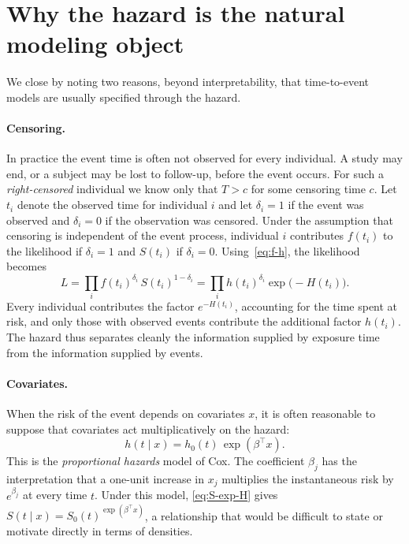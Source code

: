 \documentclass[11pt]{article}
\theoremstyle{definition}
\theoremstyle{plain}
\begin{document}
\section{Why the hazard is the natural modeling object}\label{sec:why}

We close by noting two reasons, beyond interpretability, that time-to-event models are usually specified through the hazard.

\paragraph{Censoring.} In practice the event time is often not observed for every individual. A study may end, or a subject may be lost to follow-up, before the event occurs. For such a \emph{right-censored} individual we know only that $T > c$ for some censoring time $c$. Let $t_i$ denote the observed time for individual $i$ and let $\delta_i = 1$ if the event was observed and $\delta_i = 0$ if the observation was censored. Under the assumption that censoring is independent of the event process, individual $i$ contributes $f(t_i)$ to the likelihood if $\delta_i = 1$ and $S(t_i)$ if $\delta_i = 0$. Using~\eqref{eq:f-h}, the likelihood becomes
\[
  L = \prod_i f(t_i)^{\delta_i}\, S(t_i)^{1 - \delta_i}
    = \prod_i h(t_i)^{\delta_i} \exp\bigl(-H(t_i)\bigr).
\]
Every individual contributes the factor $e^{-H(t_i)}$, accounting for the time spent at risk, and only those with observed events contribute the additional factor $h(t_i)$. The hazard thus separates cleanly the information supplied by exposure time from the information supplied by events.

\paragraph{Covariates.} When the risk of the event depends on covariates $x$, it is often reasonable to suppose that covariates act multiplicatively on the hazard:
\[
  h(t \mid x) = h_0(t)\,\exp(\beta^\top x).
\]
This is the \emph{proportional hazards} model of Cox. The coefficient $\beta_j$ has the interpretation that a one-unit increase in $x_j$ multiplies the instantaneous risk by $e^{\beta_j}$ at every time $t$. Under this model, \eqref{eq:S-exp-H} gives $S(t \mid x) = S_0(t)^{\exp(\beta^\top x)}$, a relationship that would be difficult to state or motivate directly in terms of densities.
\end{document}
